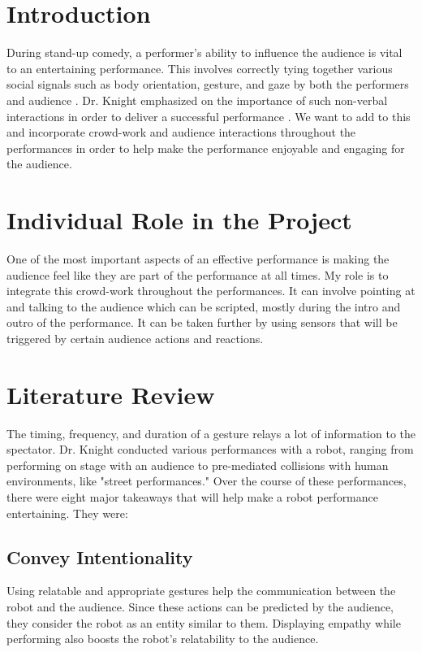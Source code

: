 \documentclass[onecolumn, draftclsnofoot,10pt, compsoc]{IEEEtran}
\begin{document}
\section{Introduction}
During stand-up comedy, a performer's ability to influence the audience is vital to an entertaining performance. This involves correctly tying together various social signals such as body orientation, gesture, and gaze by both the performers and audience \cite{RobotComedyLab:2015}. Dr. Knight emphasized on the importance of such non-verbal interactions in order to deliver a successful performance \cite{KnightEightLessons:2011}. We want to add to this and incorporate crowd-work and audience interactions throughout the performances in order to help make the performance enjoyable and engaging for the audience.

\section{Individual Role in the Project}
One of the most important aspects of an effective performance is making the audience feel like they are part of the performance at all times. My role is to integrate this crowd-work throughout the performances. It can involve pointing at and talking to the audience which can be scripted, mostly during the intro and outro of the performance. It can be taken further by using sensors that will be triggered by certain audience actions and reactions. 

\section{Literature Review}
The timing, frequency, and duration of a gesture relays a lot of information to the spectator. Dr. Knight conducted various performances with a robot, ranging from performing on stage with an audience to pre-mediated collisions with human environments, like "street performances." Over the course of these performances, there were eight major takeaways that will help make a robot performance entertaining. They were:

\subsection{Convey Intentionality}
Using relatable and appropriate gestures help the communication between the robot and the audience. Since these actions can be predicted by the audience, they consider the robot as an entity similar to them. Displaying empathy while performing also boosts the robot's relatability to the audience.
\end{document}
